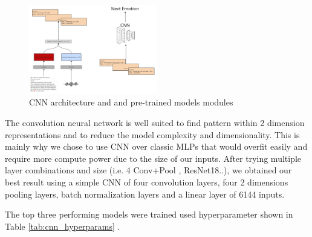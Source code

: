 \documentclass{article}
\begin{document}
\begin{figure}[tbp]
  \centering
  \includegraphics[width=0.5\textwidth]{Images/cnn_architecture.png}
  \caption{CNN architecture and and pre-trained models modules}
  \label{fig:cnn_architecture}
\end{figure}

The convolution neural network is well suited to find pattern within 2 dimension representations and to reduce the model complexity and dimensionality. This is mainly why we chose to use CNN over classic MLPs that would overfit easily and require more compute power due to the size of our inputs.
After trying multiple layer combinations and size (i.e. 4 Conv+Pool , ResNet18..), we obtained our best result using a simple CNN of four convolution layers, four 2 dimensions pooling layers, batch normalization layers and a linear layer of 6144 inputs.

The top three performing models were trained used hyperparameter shown in Table \ref{tab:cnn_hyperparams} .

\begin{table}[htbp]
\centering
\caption{Hyperparameters used in the top three performing CNN models}
\label{tab:cnn_hyperparams}
\end{table}
\end{document}
